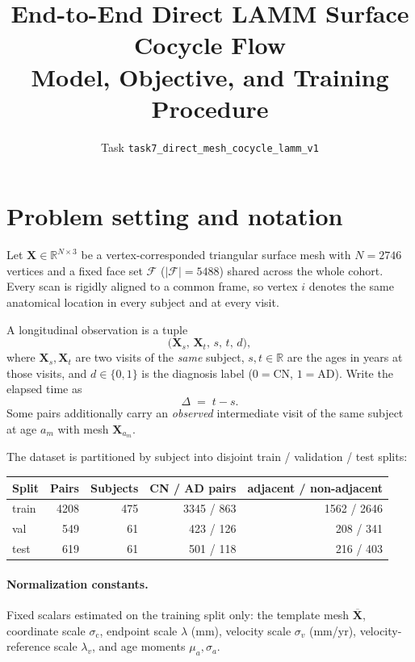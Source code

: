 \documentclass[11pt]{article}
\title{End-to-End Direct LAMM Surface Cocycle Flow\\
\large Model, Objective, and Training Procedure}
\author{Task \texttt{task7\_direct\_mesh\_cocycle\_lamm\_v1}}
\date{}
\newcommand{\R}{\mathbb{R}}
\newcommand{\X}{\bm{X}}
\newcommand{\Faces}{\mathcal{F}}
\begin{document}
\maketitle

\section{Problem setting and notation}

Let $\X \in \R^{N \times 3}$ be a vertex-corresponded triangular surface mesh with
$N = 2746$ vertices and a fixed face set $\Faces$ ($|\Faces| = 5488$) shared across the
whole cohort. Every scan is rigidly aligned to a common frame, so vertex $i$ denotes the
same anatomical location in every subject and at every visit.

A longitudinal observation is a tuple
\begin{equation}
  \bigl(\X_s,\, \X_t,\, s,\, t,\, d\bigr),
\end{equation}
where $\X_s, \X_t$ are two visits of the \emph{same} subject, $s, t \in \R$ are the ages in
years at those visits, and $d \in \{0, 1\}$ is the diagnosis label ($0 = \mathrm{CN}$,
$1 = \mathrm{AD}$). Write the elapsed time as
\begin{equation}
  \Delta \;=\; t - s .
\end{equation}
Some pairs additionally carry an \emph{observed} intermediate visit of the same subject at
age $a_m$ with mesh $\X_{a_m}$.

The dataset is partitioned by subject into disjoint train / validation / test splits:
\begin{center}
\begin{tabular}{lrrrr}
\toprule
Split & Pairs & Subjects & CN / AD pairs & adjacent / non-adjacent \\
\midrule
train & 4208 & 475 & 3345 / 863 & 1562 / 2646 \\
val   &  549 &  61 &  423 / 126 &  208 /  341 \\
test  &  619 &  61 &  501 / 118 &  216 /  403 \\
\bottomrule
\end{tabular}
\end{center}

\paragraph{Normalization constants.} Fixed scalars estimated on the training split only:
the template mesh $\overline{\X}$, coordinate scale $\sigma_{\mathrm{c}}$, endpoint scale
$\lambda$ (mm), velocity scale $\sigma_{v}$ (mm/yr), velocity-reference scale $\lambda_v$,
and age moments $\mu_a, \sigma_a$.
\end{document}
